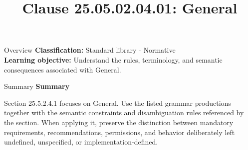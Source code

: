 \documentclass[10pt,letterpaper]{article}
\title{Clause 25.05.02.04.01: General}
\author{}
\date{}
\begin{document}
\maketitle
\begin{CornellOverviewBox}{Overview}
\textbf{Classification:} Standard library - Normative\\[2pt]
\textbf{Learning objective:} Understand the rules, terminology, and semantic consequences associated with General.
\end{CornellOverviewBox}\begin{CornellSummaryBox}{Summary}
{\sffamily\bfseries\color{Accent} Summary}\par\vspace{3pt}Section 25.5.2.4.1 focuses on General. Use the listed grammar productions together with the semantic constraints and disambiguation rules referenced by the section. When applying it, preserve the distinction between mandatory requirements, recommendations, permissions, and behavior deliberately left undefined, unspecified, or implementation-defined.
\end{CornellSummaryBox}
\end{document}
